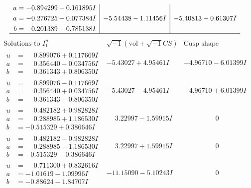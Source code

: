 \documentclass[1p]{elsarticle_modified}
\theoremstyle{definition}
\newcommand{\I}{\sqrt{-1}}
\begin{document}
$$\begin{array}{c|c|c}
\begin{aligned}
u &= -0.894299 - 0.161895 I \\
a &= -0.276725 + 0.077384 I \\
b &= -0.201389 - 0.785138 I\end{aligned}
 & -5.54438 - 1.11456 I & -5.40813 - 0.61307 I\\
 \hline 
 \end{array}$$\newpage$$\begin{array}{c|c|c}  
\text{Solutions to }I^u_{1}& \I (\text{vol} + \sqrt{-1}CS) & \text{Cusp shape}\\
 \hline 
\begin{aligned}
u &= \phantom{-}0.899076 + 0.117669 I \\
a &= \phantom{-}0.356440 - 0.034756 I \\
b &= \phantom{-}0.361343 + 0.806350 I\end{aligned}
 & -5.43027 + 4.95461 I & -4.96710 - 6.01399 I \\ \hline\begin{aligned}
u &= \phantom{-}0.899076 - 0.117669 I \\
a &= \phantom{-}0.356440 + 0.034756 I \\
b &= \phantom{-}0.361343 - 0.806350 I\end{aligned}
 & -5.43027 - 4.95461 I & -4.96710 + 6.01399 I \\ \hline\begin{aligned}
u &= \phantom{-}0.482182 + 0.982828 I \\
a &= \phantom{-}0.288985 + 1.186530 I \\
b &= -0.515329 + 0.386646 I\end{aligned}
 & \phantom{-}3.22997 - 1.59915 I & \phantom{-0.000000 } 0 \\ \hline\begin{aligned}
u &= \phantom{-}0.482182 - 0.982828 I \\
a &= \phantom{-}0.288985 - 1.186530 I \\
b &= -0.515329 - 0.386646 I\end{aligned}
 & \phantom{-}3.22997 + 1.59915 I & \phantom{-0.000000 } 0 \\ \hline\begin{aligned}
u &= \phantom{-}0.711300 + 0.832616 I \\
a &= -1.01619 - 1.09996 I \\
b &= -0.88624 - 1.84707 I\end{aligned}
 & -11.15090 - 5.10243 I & \phantom{-0.000000 } 0 \\ \hline\begin{aligned}

\end{aligned}
\end{array}$$
\end{document}
